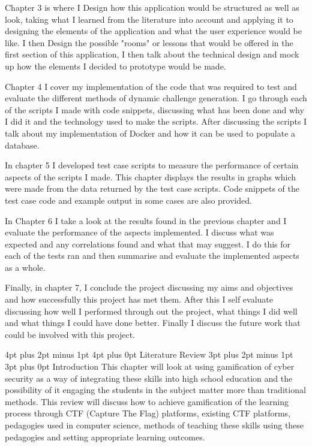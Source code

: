 \documentclass[12pt,a4paper]{article}
\makeatletter
\renewcommand\subsection{\@startsection {subsection}{1}{2mm} %
                               {3pt plus 2pt minus 1pt} %
                               {3pt plus 0pt} %
                               {\normalfont\bfseries}}
\renewcommand\section{\@startsection {section}{1}{0mm} %
                               {4pt plus 2pt minus 1pt} %
                               {4pt plus 0pt} %
                               {\bfseries}}
\makeatother
\begin{document}
Chapter 3 is where I Design how this application would be structured as well as look, taking what I learned from the literature into account and applying it to designing the elements of the application and what the user experience would be like. I then Design the possible "rooms" or lessons that would be offered in the first section of this application, I then talk about the technical design and mock up how the elements I decided to prototype would be made.  

Chapter 4 I cover my implementation of the code that was required to test and evaluate the different methods of dynamic challenge generation. I go through each of the scripts I made with code snippets, discussing what has been done and why I did it and the technology used to make the scripts. After discussing the scripts I talk about my implementation of Docker and how it can be used to populate a database.  

In chapter 5 I developed test case scripts to measure the performance of certain aspects of the scripts I made. This chapter displays the results in graphs which were made from the data returned by the test case scripts. Code snippets of the test case code and example output in some cases are also provided. 

In Chapter 6 I take a look at the results found in the previous chapter and I evaluate the performance of the aspects implemented. I discuss what was expected and any correlations found and what that may suggest. I do this for each of the tests ran and then summarise and evaluate the implemented aspects as a whole. 

Finally, in chapter 7, I conclude the project discussing my aims and objectives and how successfully this project has met them. After this I self evaluate discussing how well I performed through out the project, what things I did well and what things I could have done better. Finally I discuss the future work that could be involved with this project.




\section{Literature Review}
\subsection{Introduction}
This chapter will look at using gamification of cyber security as a way of integrating these skills into high school education and the possibility of it engaging the students in the subject matter more than traditional methods. This review will discuss how to achieve gamification of the learning process through CTF (Capture The Flag) platforms, existing CTF platforms, pedagogies used in computer science, methods of teaching these skills using these pedagogies and setting appropriate learning outcomes.  
\end{document}
